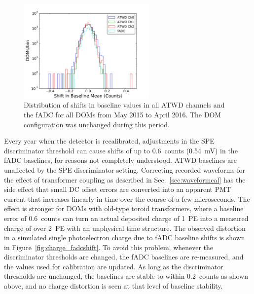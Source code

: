\begin{figure}[!h]
 \centering
 \includegraphics[width=0.6\textwidth]{graphics/dom/reliability/baseline_stability_2015.pdf}
 \caption{Distribution of shifts in baseline values in all ATWD
   channels and the fADC for all DOMs from May 2015 to April
   2016. The DOM configuration was unchanged during this period.}
 \label{fig:baseline_stability_2015}
\end{figure}

Every year when the detector
is recalibrated, adjustments in the SPE discriminator threshold can
cause shifts of up to 0.6~counts (0.54~mV) in the fADC
baselines, for reasons not completely understood. ATWD baselines are
unaffected by the SPE discriminator 
setting. Correcting recorded waveforms for the effect of transformer
coupling as described in Sec.~\ref{sec:waveformcal} has
the side effect that small DC offset errors are converted into an
apparent PMT current that increases linearly in time over the course
of a few microseconds. The effect is stronger for DOMs with old-type toroid
transformers, where a baseline error of 0.6~counts can 
turn an actual deposited charge of 1~PE into a measured charge of over
2~PE with an unphysical time structure. The observed distortion in a
simulated single photoelectron charge due to fADC baseline shifts is
shown in Figure~\ref{fig:charge_fadcshift}.  To avoid this problem, whenever the
discriminator thresholds are changed, the fADC baselines are re-measured,
and the values used for calibration are updated. As long as 
the discriminator thresholds are unchanged, the baselines are stable
to within 0.2~counts
as shown above, and no charge distortion is seen at that level of
baseline stability.

